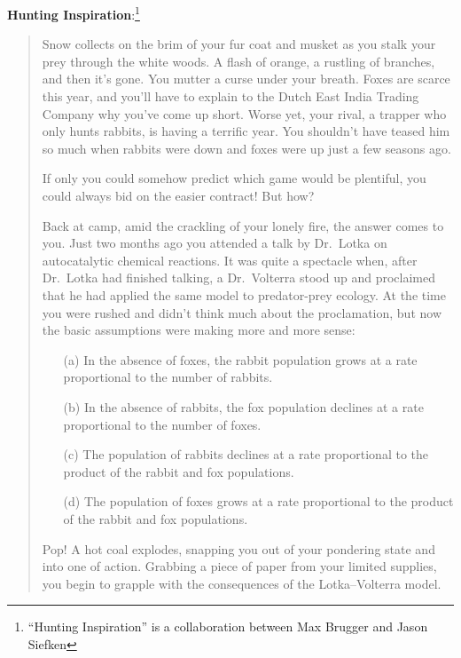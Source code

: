 \documentclass[letter]{article}
\newcommand{\setheader}[6]{
	\lhead{{\sc #1}\\{\sc #2} ({\small \it \today})}
	\rhead{
		{\bf #3} 
		\ifthenelse{\equal{#4}{}}{}{(#4)}\\
		{\bf #5} 
		\ifthenelse{\equal{#6}{}}{}{(#6)}%
	}
}
\begin{document}
	\setheader{Math 281-2}{Project 2}{Due Friday, February 17}{}{}{}

	{\bf Hunting Inspiration}:\footnote{``Hunting Inspiration'' is a collaboration between Max Brugger and Jason Siefken}
	\vspace{-.3cm}
	\begin{quote}
		Snow collects on the brim of your fur coat and musket 
		as you stalk your prey through the white woods.  A flash 
		of orange, a rustling of branches, and then it's
		gone.
		You mutter a curse under your breath.  Foxes are scarce this year, 
		and you'll have to explain to the Dutch East India Trading Company 
		why you've come up short.  Worse yet, your rival, a
		trapper who only hunts 
		rabbits, is having a terrific year.  You shouldn't have teased him so 
		much when rabbits were down and foxes were up just a few seasons ago.

		If only you could somehow predict which game would be plentiful, you
		could always bid on the easier contract!  But how?

		Back at camp, amid the crackling of your lonely fire, 
		the answer comes to you.  Just two months ago
		you attended a talk by Dr.~\!Lotka on autocatalytic 
		chemical reactions.  It was quite a spectacle when,
		after Dr.~\!Lotka had finished talking, a Dr.~\!Volterra stood up
		and proclaimed
		that he had applied the same model to predator-prey ecology.  At
		the time you were rushed and didn't think much about the proclamation, but now the
		basic assumptions were making more and more sense:

		\begin{enumerate}
			\item[(a)] In the absence of foxes, the rabbit population grows
				at a rate proportional to the number of rabbits.
			\item[(b)] In the absence of rabbits, the fox population declines
				at a rate proportional to the number of foxes.
			\item[(c)] The population of rabbits declines at a rate proportional
				to the product of the rabbit and fox populations.
			\item[(d)] The population of foxes grows at a rate proportional 
				to the product of the rabbit and fox populations.
		\end{enumerate}

		Pop! A hot coal explodes, snapping you out of your pondering state
		and into one of action.  Grabbing a piece of paper from your limited
		supplies, you begin to grapple with the consequences of the
		Lotka--Volterra model.
	\end{quote}
\end{document}
